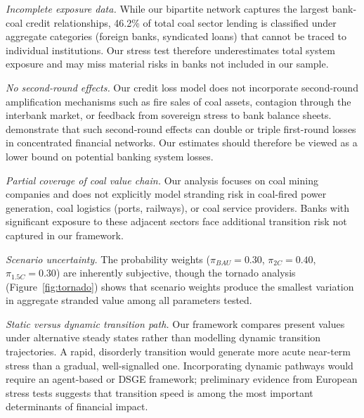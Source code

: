 \textit{Incomplete exposure data.} While our bipartite network captures the largest bank-coal credit relationships, 46.2\% of total coal sector lending is classified under aggregate categories (foreign banks, syndicated loans) that cannot be traced to individual institutions. Our stress test therefore underestimates total system exposure and may miss material risks in banks not included in our sample.

\textit{No second-round effects.} Our credit loss model does not incorporate second-round amplification mechanisms such as fire sales of coal assets, contagion through the interbank market, or feedback from sovereign stress to bank balance sheets. \citet{Roncoroni2021} demonstrate that such second-round effects can double or triple first-round losses in concentrated financial networks. Our estimates should therefore be viewed as a lower bound on potential banking system losses.

\textit{Partial coverage of coal value chain.} Our analysis focuses on coal mining companies and does not explicitly model stranding risk in coal-fired power generation, coal logistics (ports, railways), or coal service providers. Banks with significant exposure to these adjacent sectors face additional transition risk not captured in our framework.

\textit{Scenario uncertainty.} The probability weights ($\pi_{BAU} = 0.30$, $\pi_{2C} = 0.40$, $\pi_{1.5C} = 0.30$) are inherently subjective, though the tornado analysis (Figure~\ref{fig:tornado}) shows that scenario weights produce the smallest variation in aggregate stranded value among all parameters tested.

\textit{Static versus dynamic transition path.} Our framework compares present values under alternative steady states rather than modelling dynamic transition trajectories. A rapid, disorderly transition would generate more acute near-term stress than a gradual, well-signalled one. Incorporating dynamic pathways would require an agent-based or DSGE framework; preliminary evidence from European stress tests \citep{ECB2022} suggests that transition speed is among the most important determinants of financial impact.
